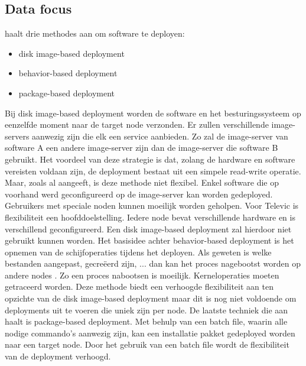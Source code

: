 \subsection{Data focus}
\citet{deploymentMethods} haalt drie methodes aan om software te deployen:
\begin{itemize}
\item disk image-based deployment
\item behavior-based deployment
\item package-based deployment
\end{itemize}
Bij disk image-based deployment worden de software en het besturingssysteem op eenzelfde moment naar de target node verzonden.
Er zullen verschillende image-servers aanwezig zijn die elk een service aanbieden.
Zo zal de image-server van software A een andere image-server zijn dan de image-server die software B gebruikt.
Het voordeel van deze strategie is dat, zolang de hardware en software vereisten voldaan zijn, de deployment bestaat uit een simpele read-write operatie.
Maar, zoals \citet{deploymentMethods} al aangeeft, is deze methode niet flexibel.
Enkel software die op voorhand werd geconfigureerd op de image-server kan worden gedeployed.
Gebruikers met speciale noden kunnen moeilijk worden geholpen.
Voor Televic is flexibiliteit een hoofddoelstelling.
Iedere node bevat verschillende hardware en is verschillend geconfigureerd.
Een disk image-based deployment zal hierdoor niet gebruikt kunnen worden.
Het basisidee achter behavior-based deployment is het opnemen van de schijfoperaties tijdens het deployen.
Als geweten is welke bestanden aangepast, gecreëerd zijn, ... dan kan het proces nagebootst worden op andere nodes \citep{deploymentMethods}.
Zo een proces nabootsen is moeilijk.
Kerneloperaties moeten getraceerd worden.
Deze methode biedt een verhoogde flexibiliteit aan ten opzichte van de disk image-based deployment maar dit is nog niet voldoende om deployments uit te voeren die uniek zijn per node.
De laatste techniek die \citet{deploymentMethods} aan haalt is package-based deployment.
Met behulp van een batch file, waarin alle nodige commando's aanwezig zijn, kan een installatie pakket gedeployed worden naar een target node.
Door het gebruik van een batch file wordt de flexibiliteit van de deployment verhoogd.

